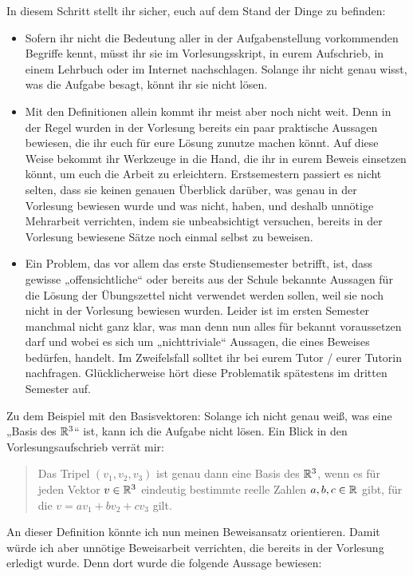 \begin{phaseone}[Recherche]
    In diesem Schritt stellt ihr sicher, euch auf dem Stand der Dinge zu befinden:
    \begin{itemize}
        \item Sofern ihr nicht die Bedeutung aller in der Aufgabenstellung vorkommenden Begriffe kennt, müsst ihr sie im Vorlesungsskript, in eurem Aufschrieb, in einem Lehrbuch oder im Internet nachschlagen. Solange ihr nicht genau wisst, was die Aufgabe besagt, könnt ihr sie nicht lösen.
        \item Mit den Definitionen allein kommt ihr meist aber noch nicht weit. Denn in der Regel wurden in der Vorlesung bereits ein paar praktische Aussagen bewiesen, die ihr euch für eure Lösung zunutze machen könnt. Auf diese Weise bekommt ihr Werkzeuge in die Hand, die ihr in eurem Beweis einsetzen könnt, um euch die Arbeit zu erleichtern. Erstsemestern passiert es nicht selten, dass sie keinen genauen Überblick darüber, was genau in der Vorlesung bewiesen wurde und was nicht, haben, und deshalb unnötige Mehrarbeit verrichten, indem sie unbeabsichtigt versuchen, bereits in der Vorlesung bewiesene Sätze noch einmal selbst zu beweisen.
        \item Ein Problem, das vor allem das erste Studiensemester betrifft, ist, dass gewisse „offensichtliche“ oder bereits aus der Schule bekannte Aussagen für die Lösung der Übungszettel nicht verwendet werden sollen, weil sie noch nicht in der Vorlesung bewiesen wurden. Leider ist im ersten Semester manchmal nicht ganz klar, was man denn nun alles für bekannt voraussetzen darf und wobei es sich um „nichttriviale“ Aussagen, die eines Beweises bedürfen, handelt. Im Zweifelsfall solltet ihr bei eurem Tutor / eurer Tutorin nachfragen. Glücklicherweise hört diese Problematik spätestens im dritten Semester auf.
    \end{itemize}
    Zu dem Beispiel mit den Basisvektoren: Solange ich nicht genau weiß, was eine „Basis des $\mathbb R^3$“ ist, kann ich die Aufgabe nicht lösen. Ein Blick in den Vorlesungsaufschrieb verrät mir:
    \begin{quote}
        Das Tripel $(v_1,v_2,v_3)$ ist genau dann eine Basis des $\mathbb R^3$, wenn es für jeden Vektor $v\in \mathbb R^3$ eindeutig bestimmte reelle Zahlen $a,b,c\in \mathbb R$ gibt, für die $v=av_1+bv_2+cv_3$ gilt.
    \end{quote}
    An dieser Definition könnte ich nun meinen Beweisansatz orientieren. Damit würde ich aber unnötige Beweisarbeit verrichten, die bereits in der Vorlesung erledigt wurde. Denn dort wurde die folgende Aussage bewiesen:

\end{phaseone}

